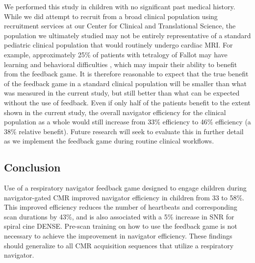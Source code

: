 		We performed this study in children with no significant past medical history. While we did attempt to recruit from a broad clinical population using recruitment services at our Center for Clinical and Translational Science, the population we ultimately studied may not be entirely representative of a standard pediatric clinical population that would routinely undergo cardiac MRI. For example, approximately 25\% of patients with tetralogy of Fallot may have learning and behavioral difficulties \cite{Piran2011}, which may impair their ability to benefit from the feedback game. It is therefore reasonable to expect that the true benefit of the feedback game in a standard clinical population will be smaller than what was measured in the current study, but still better than what can be expected without the use of feedback. Even if only half of the patients benefit to the extent shown in the current study, the overall navigator efficiency for the clinical population as a whole would still increase from 33\% efficiency to 46\% efficiency (a 38\% relative benefit). Future research will seek to evaluate this in further detail as we implement the feedback game during routine clinical workflows.
		
	\subsection{Conclusion}
		Use of a respiratory navigator feedback game designed to engage children during navigator-gated CMR improved navigator efficiency in children from 33 to 58\%. This improved efficiency reduces the number of heartbeats and corresponding scan durations by 43\%, and is also associated with a 5\% increase in SNR for spiral cine DENSE. Pre-scan training on how to use the feedback game is not necessary to achieve the improvement in navigator efficiency. These findings should generalize to all CMR acquisition sequences that utilize a respiratory navigator.